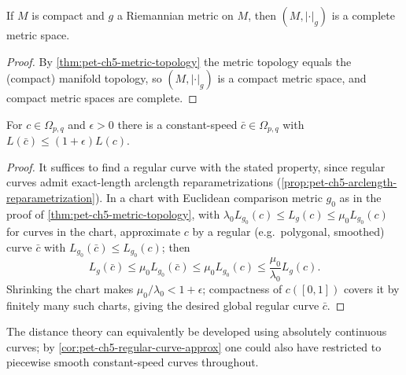 \begin{corollary}
  \label{cor:pet-ch5-compact-complete-metric}
  \leanok
  If $M$ is compact and $g$ a Riemannian metric on $M$, then $(M,|\cdot|_g)$ is a
  complete metric space.
\end{corollary}
\begin{proof}
  \leanok
  By \cref{thm:pet-ch5-metric-topology} the metric topology equals the (compact)
  manifold topology, so $(M,|\cdot|_g)$ is a compact metric space, and compact metric
  spaces are complete.
\end{proof}

\begin{corollary}
  \label{cor:pet-ch5-regular-curve-approx}
  \leanok
  For $c\in\Omega_{p,q}$ and $\epsilon>0$ there is a constant-speed
  $\bar c\in\Omega_{p,q}$ with $L(\bar c)\le(1+\epsilon)L(c)$.
\end{corollary}
\begin{proof}
  \leanok
  It suffices to find a regular curve with the stated property, since regular curves
  admit exact-length arclength reparametrizations
  (\cref{prop:pet-ch5-arclength-reparametrization}). In a chart with Euclidean
  comparison metric $g_0$ as in the proof of \cref{thm:pet-ch5-metric-topology}, with
  $\lambda_0L_{g_0}(c)\le L_g(c)\le\mu_0L_{g_0}(c)$ for curves in the chart,
  approximate $c$ by a regular (e.g.\ polygonal, smoothed) curve $\bar c$ with
  $L_{g_0}(\bar c)\le L_{g_0}(c)$; then
  \[
    L_g(\bar c)\le\mu_0L_{g_0}(\bar c)\le\mu_0L_{g_0}(c)\le\frac{\mu_0}{\lambda_0}L_g(c).
  \]
  Shrinking the chart makes $\mu_0/\lambda_0<1+\epsilon$; compactness of $c([0,1])$
  covers it by finitely many such charts, giving the desired global regular curve
  $\bar c$.
\end{proof}

\begin{remark}
  \label{rem:pet-ch5-absolutely-continuous-curves}
  The distance theory can equivalently be developed using absolutely continuous
  curves; by \cref{cor:pet-ch5-regular-curve-approx} one could also have restricted
  to piecewise smooth constant-speed curves throughout.
\end{remark}

